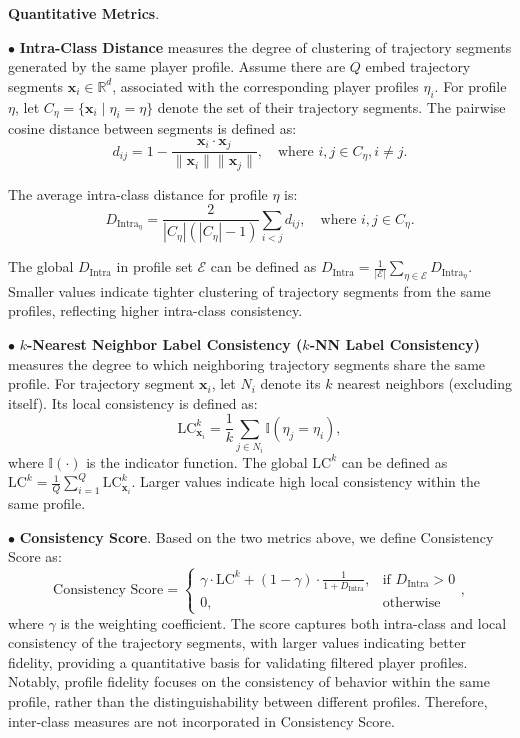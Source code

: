 \documentclass{article}
\theoremstyle{plain}
\theoremstyle{definition}
\theoremstyle{remark}
\begin{document}
\textbf{Quantitative Metrics}.

$\bullet$ \textbf{Intra-Class Distance}
measures the degree of clustering of trajectory segments generated by the same player profile. Assume there are $Q$ embed trajectory segments $\mathbf{x}_i \in \mathbb{R}^d$, associated with the corresponding player profiles $\eta_i$. For profile $\eta$, let $C_\eta = \{\mathbf{x}_i \mid \eta_i = \eta\}$ denote the set of their trajectory segments. The pairwise cosine distance between segments is defined as:
\begin{equation}
    d_{ij} = 1 - \frac{\mathbf{x}_i \cdot \mathbf{x}_j}{\|\mathbf{x}_i\| \|\mathbf{x}_j\|}, \quad \text{where } i,j \in C_\eta,i \neq j.
\end{equation}

The average intra-class distance for profile $\eta$ is:
\begin{equation}
D_{\text{Intra}_\eta}=\frac{2}{|C_\eta|( |C_\eta|-1 )}\sum_{i<j}{d_{ij}},\quad\text{where } i,j\in C_\eta.
\end{equation}

The global $D_\text{Intra}$ in profile set $\mathcal{E}$ can be defined as $D_\text{Intra}=\frac{1}{|\mathcal{E}|}\sum_{\eta\in \mathcal{E}}{D_{\text{Intra}_\eta}}$. Smaller values indicate tighter clustering of trajectory segments from the same profiles, reflecting higher intra-class consistency.

$\bullet$ \textbf{$k$-Nearest Neighbor Label Consistency ($k$-NN Label Consistency)} measures the degree to which neighboring trajectory segments share the same profile. For trajectory segment $\mathbf{x}_i$, let $N_i$ denote its $k$ nearest neighbors (excluding itself). Its local consistency is defined as:
\begin{equation}
\text{LC}^{k}_{\mathbf{x}_i}=\frac{1}{k}\sum_{j\in N_i}{\mathbb{I}\left( \eta_j=\eta_i \right)},
\end{equation}
where $\mathbb{I}(\cdot)$ is the indicator function. The global $\text{LC}^k$ can be defined as $\text{LC}^k = \frac{1}{Q} \sum_{i=1}^{Q} \text{LC}_{\mathbf{x}_i}^k$. Larger values indicate high local consistency within the same profile.

$\bullet$ \textbf{Consistency Score}. Based on the two metrics above, we define Consistency Score as:
\begin{equation}
\text{Consistency Score} =
\begin{cases}
\gamma \cdot \text{LC}^k + (1-\gamma) \cdot \frac{1}{1+D_\text{Intra}}, & \text{if } D_\text{Intra} > 0\\
0, & \text{otherwise}
\end{cases},
\end{equation}
where $\gamma$ is the weighting coefficient. The score captures both intra-class and local consistency of the trajectory segments, with larger values indicating better fidelity, providing a quantitative basis for validating filtered player profiles. Notably, profile fidelity focuses on the consistency of behavior within the same profile, rather than the distinguishability between different profiles. Therefore, inter-class measures are not incorporated in Consistency Score.
\end{document}
